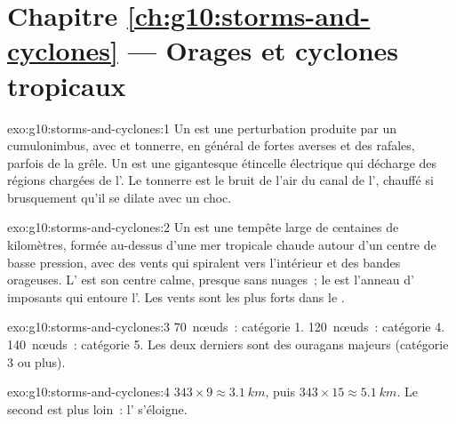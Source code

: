 \section*{Chapitre \ref{ch:g10:storms-and-cyclones} --- Orages et cyclones tropicaux}

\begin{solution}{exo:g10:storms-and-cyclones:1}
Un  est une perturbation produite par un cumulonimbus, avec  et
tonnerre, en général de fortes averses et des rafales, parfois de la grêle.
Un  est une gigantesque étincelle électrique qui décharge des régions
chargées de l'. Le tonnerre est le bruit de l'air du canal de l',
chauffé si brusquement qu'il se dilate avec un choc.
\end{solution}

\begin{solution}{exo:g10:storms-and-cyclones:2}
Un  est une tempête large de centaines de kilomètres, formée
au-dessus d'une mer tropicale chaude autour d'un centre de basse pression,
avec des vents qui spiralent vers l'intérieur et des bandes orageuses. L'
est son centre calme, presque sans nuages~; le  est l'anneau
d' imposants qui entoure l'. Les vents sont les plus forts dans le
.
\end{solution}

\begin{solution}{exo:g10:storms-and-cyclones:3}
\num{70}~nœuds~: catégorie 1. \num{120}~nœuds~: catégorie 4.
\num{140}~nœuds~: catégorie 5. Les deux derniers sont des ouragans majeurs
(catégorie 3 ou plus).
\end{solution}

\begin{solution}{exo:g10:storms-and-cyclones:4}
$343 \times 9 \approx \qty{3.1}{km}$, puis $343 \times 15 \approx
\qty{5.1}{km}$. Le second  est plus loin~: l' s'éloigne.
\end{solution}

